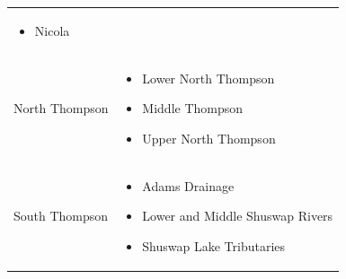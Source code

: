 \documentclass[
]{article}
\providecommand{\tightlist}{%
  \setlength{\itemsep}{0pt}\setlength{\parskip}{0pt}}
\begin{document}
\begin{longtable}[]{@{}ll@{}}
\begin{minipage}[t]{0.43\columnwidth}
\begin{itemize}
\item
  Nicola
\end{itemize}\strut
\end{minipage}\tabularnewline
\begin{minipage}[t]{0.26\columnwidth}\raggedright
North Thompson\strut
\end{minipage} & \begin{minipage}[t]{0.43\columnwidth}\raggedright
\begin{itemize}
\tightlist
\item
  Lower North Thompson
\item
  Middle Thompson
\item
  Upper North Thompson
\end{itemize}\strut
\end{minipage}\tabularnewline
\begin{minipage}[t]{0.26\columnwidth}\raggedright
South Thompson\strut
\end{minipage} & \begin{minipage}[t]{0.43\columnwidth}\raggedright
\begin{itemize}
\tightlist
\item
  Adams Drainage
\item
  Lower and Middle Shuswap Rivers
\item
  Shuswap Lake Tributaries
\end{itemize}\strut
\end{minipage}\tabularnewline
\bottomrule
\end{longtable}
\end{document}
